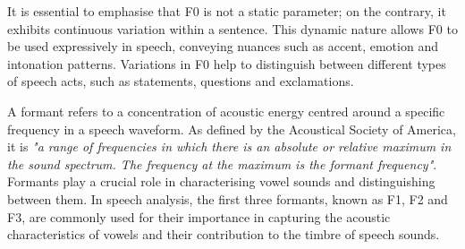 It is essential to emphasise that F0 is not a static parameter; on the contrary, it exhibits continuous variation within a sentence. This dynamic nature allows F0 to be used expressively in speech, conveying nuances such as accent, emotion and intonation patterns. Variations in F0 help to distinguish between different types of speech acts, such as statements, questions and exclamations.



A formant refers to a concentration of acoustic energy centred around a specific frequency in a speech waveform. As defined by the Acoustical Society of America, it is \textit{"a range of frequencies in which there is an absolute or relative maximum in the sound spectrum. The frequency at the maximum is the formant frequency"}. Formants play a crucial role in characterising vowel sounds and distinguishing between them. In speech analysis, the first three formants, known as F1, F2 and F3, are commonly used for their importance in capturing the acoustic characteristics of vowels and their contribution to the timbre of speech sounds.


